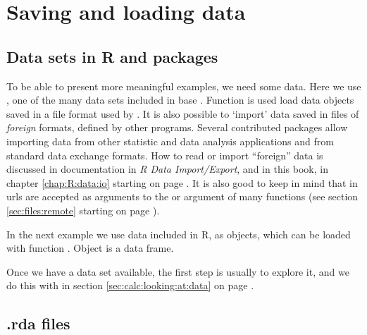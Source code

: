 \documentclass[krantz2]{krantz}\usepackage{knitr}%
\begin{document}

\section{Saving and loading data}

\subsection{Data sets in R and packages}
To be able to present more meaningful examples, we need some data. Here we use , one of the many data sets included in base \Rpgrm. Function  is used load data objects saved in a file format used by \Rlang. It is also possible to `import' data saved in files of \textit{foreign} formats, defined by other programs. Several contributed packages allow importing data from other statistic and data analysis applications and from standard data exchange formats. How to read or import ``foreign'' data is discussed in \Rlang documentation in \emph{R Data Import/Export}, and in this book, in chapter \ref{chap:R:data:io} starting on page \pageref{chap:R:data:io}. It is also good to keep in mind that in \Rlang urls are accepted as arguments to the  or  argument of many functions (see section \ref{sec:files:remote} starting on page \pageref{sec:files:remote}).

In the next example we use data included in R, as \Rlang objects, which can be loaded with function . Object  is a data frame.

\begin{knitrout}\footnotesize
{}\color{fgcolor}\begin{kframe}
\begin{alltt}
\end{alltt}
\end{kframe}
\end{knitrout}

Once we have a data set available, the first step is usually to explore it, and we do this with  in section \ref{sec:calc:looking:at:data} on page \pageref{sec:calc:looking:at:data}.

\subsection{.rda files}\label{sec:data:rda}
\end{document}
